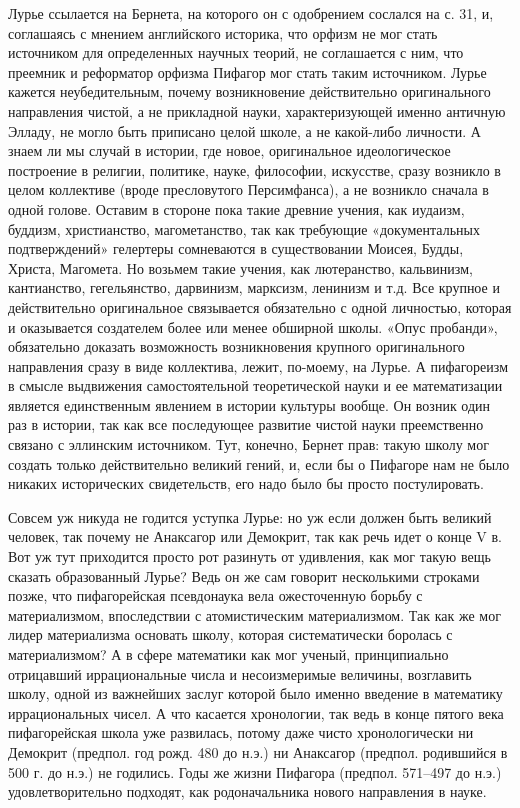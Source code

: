 Лурье  ссылается на  Бернета,  на которого  он  с одобрением  сослался
на  с.  31,   и,  соглашаясь  с  мнением   английского  историка,  что
орфизм не  мог стать  источником для  определенных научных  теорий, не
соглашается с ним, что преемник и реформатор орфизма Пифагор мог стать
таким источником.  Лурье кажется неубедительным,  почему возникновение
действительно оригинального направления чистой, а не прикладной науки,
характеризующей именно античную Элладу,  не могло быть приписано целой
школе, а не  какой-либо личности. А знаем ли мы  случай в истории, где
новое,  оригинальное идеологическое  построение  в религии,  политике,
науке, философии, искусстве, сразу  возникло в целом коллективе (вроде
пресловутого  Персимфанса),  а не  возникло  сначала  в одной  голове.
Оставим в  стороне пока  такие древние  учения, как  иудаизм, буддизм,
христианство,   магометанство,  так   как  требующие   «документальных
подтверждений»  гелертеры сомневаются  в существовании  Моисея, Будды,
Христа,   Магомета.  Но   возьмем  такие   учения,  как   лютеранство,
кальвинизм, кантианство, гегельянство, дарвинизм, марксизм, ленинизм и
т.д. Все крупное и  действительно оригинальное связывается обязательно
с одной  личностью, которая и  оказывается создателем более  или менее
обширной  школы.  «Опус  пробанди», обязательно  доказать  возможность
возникновения   крупного  оригинального   направления  сразу   в  виде
коллектива,  лежит,  по-моему,  на   Лурье.  А  пифагореизм  в  смысле
выдвижения  самостоятельной  теоретической  науки и  ее  математизации
является единственным  явлением в  истории культуры вообще.  Он возник
один  раз в  истории, так  как все  последующее развитие  чистой науки
преемственно  связано с  эллинским  источником.  Тут, конечно,  Бернет
прав: такую школу  мог создать только действительно  великий гений, и,
если бы о Пифагоре нам  не было никаких исторических свидетельств, его
надо было бы просто постулировать.

Совсем уж  никуда не  годится уступка  Лурье: но  уж если  должен быть
великий человек,  так почему не  Анаксагор или Демокрит, так  как речь
идет  о конце  V  в. Вот  уж  тут приходится  просто  рот разинуть  от
удивления,  как  мог  такую  вещь  сказать  образованный  Лурье?  Ведь
он  же  сам  говорит  несколькими строками  позже,  что  пифагорейская
псевдонаука вела  ожесточенную борьбу с материализмом,  впоследствии с
атомистическим  материализмом.  Так  как  же  мог  лидер  материализма
основать  школу,  которая  систематически  боролась  с  материализмом?
А  в  сфере  математики   как  мог  ученый,  принципиально  отрицавший
иррациональные  числа  и  несоизмеримые  величины,  возглавить  школу,
одной из  важнейших заслуг которой  было именно введение  в математику
иррациональных  чисел. А  что касается  хронологии, так  ведь в  конце
пятого  века  пифагорейская школа  уже  развилась,  потому даже  чисто
хронологически  ни  Демокрит  (предпол.  год рожд.  480  до  н.э.)  ни
Анаксагор (предпол. родившийся в 500 г.  до н.э.) не годились. Годы же
жизни Пифагора (предпол. 571--497 до н.э.) удовлетворительно подходят,
как родоначальника нового направления в науке.

